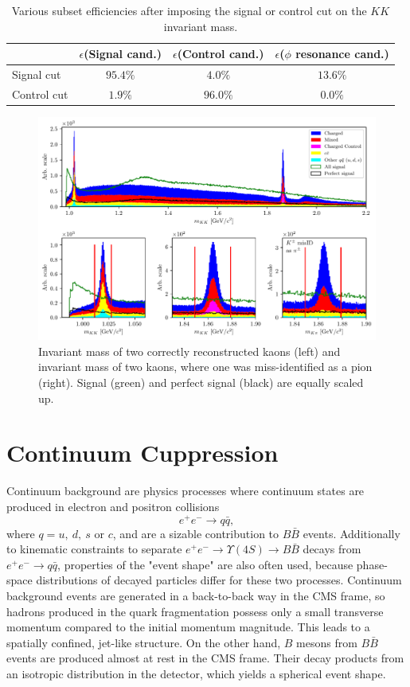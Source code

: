\begin{table}[H]
	\centering
	\begin{tabular}{|l|c|c|c|}
		\hline
		& $\epsilon$(Signal cand.)& $\epsilon$(Control cand.) & $\epsilon$($\phi$ resonance cand.)\\
		\hline
		Signal cut & $95.4\%$ & $4.0\%$ & $13.6\%$ \\
		\hline
		Control cut & $1.9\%$ & $96.0\%$ & $0.0\%$ \\
		\hline
	\end{tabular}
	\caption{Various subset efficiencies after imposing the signal or control cut on the $KK$ invariant mass.}
	\label{tab:cut_eff}
\end{table}


\begin{figure}[H]
	\centering
	\captionsetup{width=0.8\linewidth}
	\includegraphics[width=\linewidth]{fig/res_bkg}
	\caption{Invariant mass of two correctly reconstructed kaons (left) and invariant mass of two kaons, where one was miss-identified as a pion (right). Signal (green) and perfect signal (black) are equally scaled up.}
	\label{fig:res_bkg}
\end{figure}


\section{Continuum Cuppression}

Continuum background are physics processes where continuum states are produced in electron and positron collisions $$e^+ e^- \to q \bar q,$$ 
where $q = u,~d,~s$ or $c$, and are a sizable contribution to $B \bar B$ events. Additionally to kinematic constraints to separate $e^+ e^- \to \Upsilon(4S) \to B \bar B$ decays from $e^+ e^- \to q \bar q$, properties of the "event shape" are also often used, because phase-space distributions of decayed particles differ for these two processes. Continuum background events are generated in a back-to-back way in the CMS frame, so hadrons produced in the quark fragmentation possess only a small transverse momentum compared to the initial momentum magnitude. This leads to a spatially confined, jet-like structure. On the other hand, $B$ mesons from $B \bar B$ events are produced almost at rest in the CMS frame. Their decay products from an isotropic distribution in the detector, which yields a spherical event shape.

